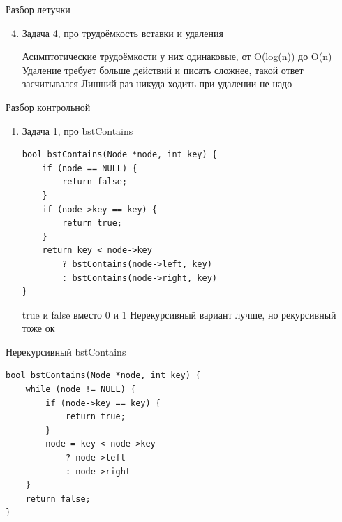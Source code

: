 \documentclass{../../slides-style}
\begin{document}
    \begin{frame}{Разбор летучки}
        \begin{enumerate}
            \setcounter{enumi}{3}
            \item Задача 4, про трудоёмкость вставки и удаления
            \begin{outline}
                \1 Асимптотические трудоёмкости у них одинаковые, от O(log(n)) до O(n)
                \1 Удаление требует больше действий и писать сложнее, такой ответ засчитывался
                \1 Лишний раз никуда ходить при удалении не надо
            \end{outline}
        \end{enumerate}
    \end{frame}

    \begin{frame}[fragile]{Разбор контрольной}
        \begin{enumerate}
            \setcounter{enumi}{0}
            \item Задача 1, про bstContains
            \begin{footnotesize}
                \begin{verbatim}
bool bstContains(Node *node, int key) {
    if (node == NULL) {
        return false;
    }
    if (node->key == key) {
        return true;
    }
    return key < node->key 
        ? bstContains(node->left, key) 
        : bstContains(node->right, key)
}
                \end{verbatim}
            \end{footnotesize}
            \begin{outline}
                \1 true и false вместо 0 и 1
                \1 Нерекурсивный вариант лучше, но рекурсивный тоже ок
            \end{outline}
        \end{enumerate}
    \end{frame}

    \begin{frame}[fragile]{Нерекурсивный bstContains}
        \begin{footnotesize}
            \begin{verbatim}
bool bstContains(Node *node, int key) {
    while (node != NULL) {
        if (node->key == key) {
            return true;
        }
        node = key < node->key 
            ? node->left 
            : node->right
    }
    return false; 
}
            \end{verbatim}
        \end{footnotesize}
    \end{frame}
\end{document}
